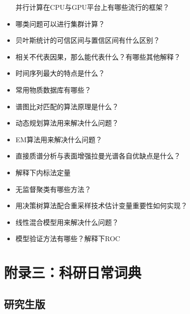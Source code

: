 \documentclass[]{tufte-book}
\begin{document}
\begin{itemize}
  并行计算在CPU与GPU平台上有哪些流行的框架？
\item
  哪类问题可以进行集群计算？
\item
  贝叶斯统计的可信区间与置信区间有什么区别？
\item
  相关不代表因果，那么能代表什么？有哪些其他解释？
\item
  时间序列最大的特点是什么？
\item
  常用物质数据库有哪些？
\item
  谱图比对匹配的算法原理是什么？
\item
  动态规划算法用来解决什么问题？
\item
  EM算法用来解决什么问题？
\item
  直接质谱分析与表面增强拉曼光谱各自优缺点是什么？
\item
  解释下内标法定量
\item
  无监督聚类有哪些方法？
\item
  用决策树算法配合重采样技术估计变量重要性如何实现？
\item
  线性混合模型用来解决什么问题？
\item
  模型验证方法有哪些？解释下ROC
\end{itemize}

\hypertarget{dict}{%
\chapter*{附录三：科研日常词典}\label{dict}}

\hypertarget{ux7814ux7a76ux751fux7248}{%
\section*{研究生版}\label{ux7814ux7a76ux751fux7248}}
\end{document}
